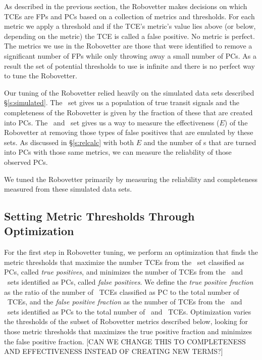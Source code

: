 \label{s:optimize}
As described in the previous section, the Robovetter makes decisions on which TCEs are FPs and PCs based on a collection of metrics and thresholds.  For each metric we apply a threshold and if the TCE's metric's value lies above (or below, depending on the metric) the TCE is called a false positive.  No metric is perfect.  The metrics we use in the Robovetter are those that were identified to remove a significant number of FPs while only throwing away a small number of PCs.  As a result the set of potential thresholds to use is infinite and there is no perfect way to tune the Robovetter.

Our tuning of the Robovetter relied heavily on the simulated data sets described \S\ref{s:simulated}. The \injtce\ set gives us a population of true transit signals and the completeness of the Robovetter is given by the fraction of these that are created into PCs.  The \scrtce\ and \invtce\ set gives us a way to measure the effectiveness ($E$) of the Robovetter at removing those types of false positives that are emulated by these sets. As discussed in \S\ref{s:relcalc} with both $E$ and the number of \opstce s that are turned into PCs with those same metrics, we can measure the reliability of those observed PCs.  

We tuned the Robovetter primarily by measuring the reliability and completeness measured from these simulated data sets. 

\subsection{Setting Metric Thresholds Through Optimization}
\label{s:full_optimize}
For the first step in Robovetter tuning, we perform an optimization that finds the metric thresholds that maximize the number TCEs from the \injtce\ set classified as PCs, called {\it true positives}, and minimizes the number of TCEs from the \scrtce\ and \invtce\ sets identified as PCs, called {\it false positives}.  We define the {\it true positive fraction} as the ratio of the number of \injtce\ TCEs classified as PC to the total number of \injtce\ TCEs, and the {\it false positive fraction} as the number of TCEs from the \scrtce\ and \invtce\ sets identified as PCs to the total number of \scrtce\ and \invtce\ TCEs.  Optimization varies the thresholds of the subset of Robovetter metrics described below, looking for those metric thresholds that maximizes the true positive fraction and minimizes the false positive fraction.  [CAN WE CHANGE THIS TO COMPLETENESS AND EFFECTIVENESS INSTEAD OF CREATING NEW TERMS?]

